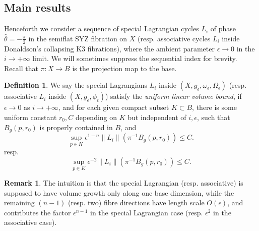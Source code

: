 \documentclass{article}
\theoremstyle{definition}
\newtheorem{rmk}{Remark}
\newtheorem{Def}[thm]{Definition}
\newcommand{\norm}[1]{\left\lVert#1\right\rVert}
\begin{document}
		
		
		
		
		
		
		
		
		
		
		
		
		
		
		
		
		
		
		
		
		\subsection{Main results}
		
		
		
		
		
		
	Henceforth we consider a sequence of  special Lagrangian cycles $L_i$ of phase $\hat{\theta}=- \frac{\pi}{2}$  in the semiflat SYZ fibration on $X$ (resp. associative cycles $L_i$ inside Donaldson's collapsing K3 fibrations), where the ambient parameter $\epsilon\to 0$ in the $i\to +\infty$ limit. We will sometimes suppress the sequential index for brevity. Recall that $\pi: X\to B$ is the projection map to the base. 
	
	
	\begin{Def}\label{Def:uniformvolumebound}
	We say the special Lagrangians $L_i$ inside $(X, g_\epsilon, \omega_\epsilon, \Omega_\epsilon)$ (resp. associative $L_i$ inside $(X, g_\epsilon, \phi_\epsilon)$) satisfy the \emph{uniform linear	volume bound}, if $\epsilon \to 0 $ as $i\to +\infty$, and 
	for each given compact subset $K\subset B$, there is 
	some uniform constant $r_0, C$ depending on $K$ but independent of $i,\epsilon$, such that $B_g(p, r_0)$ is properly contained in $B$, and 
	\begin{equation}
\sup_{   p\in K }	\epsilon^{1-n} \norm{L_i} (  \pi^{-1} B_g(p, r_0)   ) \leq C.
	\end{equation}
	resp. 
	\[
	\sup_{p\in K }	\epsilon^{-2} \norm{L_i}( \pi^{-1} B_g(p, r_0)   ) \leq C.
	\]
	\end{Def}
		
		
		\begin{rmk}
	The intuition is that the special Lagrangian (resp. associative) is supposed to have volume growth only along one base dimension, while the remaining $(n-1)$ (resp. two) fibre directions have length scale $O(\epsilon)$, and contributes the factor $\epsilon^{n-1}$ in the special Lagrangian case (resp. $\epsilon^2$ in the associative case).
	
	
	
	
		\end{rmk}
\end{document}
